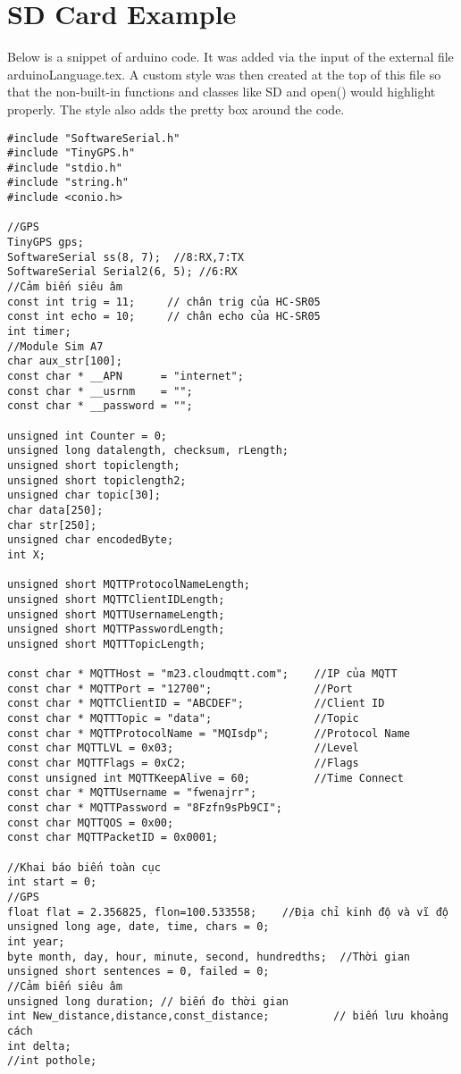 \documentclass[12pt]{article} %
\begin{document}
\section{SD Card Example}
Below is a snippet of arduino code.  It was added  via the input of the external
 file arduinoLanguage.tex.  A custom style was then created at the top of this
 file so that the non-built-in functions and classes like SD and open() would highlight
 properly.  The style also adds the pretty box around the code.\\

\begin{lstlisting}[style=myArduino]
#include "SoftwareSerial.h"
#include "TinyGPS.h"
#include "stdio.h"
#include "string.h"
#include <conio.h>

//GPS
TinyGPS gps;
SoftwareSerial ss(8, 7);  //8:RX,7:TX
SoftwareSerial Serial2(6, 5); //6:RX
//Cảm biến siêu âm
const int trig = 11;     // chân trig của HC-SR05
const int echo = 10;     // chân echo của HC-SR05
int timer;
//Module Sim A7
char aux_str[100];
const char * __APN      = "internet";
const char * __usrnm    = "";
const char * __password = "";

unsigned int Counter = 0;
unsigned long datalength, checksum, rLength;
unsigned short topiclength;
unsigned short topiclength2;
unsigned char topic[30];
char data[250];
char str[250];
unsigned char encodedByte;
int X;

unsigned short MQTTProtocolNameLength;
unsigned short MQTTClientIDLength;
unsigned short MQTTUsernameLength;
unsigned short MQTTPasswordLength;
unsigned short MQTTTopicLength;

const char * MQTTHost = "m23.cloudmqtt.com";    //IP của MQTT 
const char * MQTTPort = "12700";                //Port
const char * MQTTClientID = "ABCDEF";           //Client ID
const char * MQTTTopic = "data";                //Topic
const char * MQTTProtocolName = "MQIsdp";       //Protocol Name
const char MQTTLVL = 0x03;                      //Level
const char MQTTFlags = 0xC2;                    //Flags
const unsigned int MQTTKeepAlive = 60;          //Time Connect
const char * MQTTUsername = "fwenajrr";        
const char * MQTTPassword = "8Fzfn9sPb9CI";
const char MQTTQOS = 0x00;
const char MQTTPacketID = 0x0001;

//Khai báo biến toàn cục
int start = 0;
//GPS
float flat = 2.356825, flon=100.533558;    //Địa chỉ kinh độ và vĩ độ
unsigned long age, date, time, chars = 0;
int year;
byte month, day, hour, minute, second, hundredths;  //Thời gian
unsigned short sentences = 0, failed = 0;
//Cảm biến siêu âm
unsigned long duration; // biến đo thời gian
int New_distance,distance,const_distance;          // biến lưu khoảng cách
int delta;
//int pothole;



\end{lstlisting}
\end{document}
